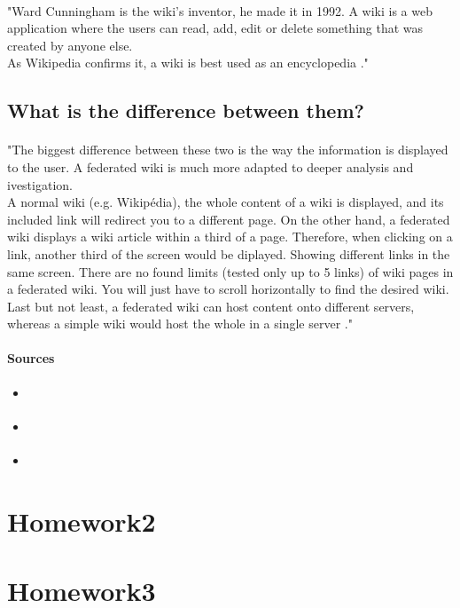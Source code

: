 \documentclass[10pt,a4paper]{article}
\begin{document}
\paragraph{}"Ward Cunningham is the wiki's inventor, he made it in 1992.
A wiki is a web application where the users can read, add, edit or delete something that was created by anyone else.\\
As Wikipedia confirms it, a wiki is best used as an encyclopedia \cite{floref3}."\cite{floref1}

\subsection{What is the difference between them?}
\paragraph{}"The biggest difference between these two is the way the information is displayed to the user. A federated wiki is much more adapted to deeper analysis and ivestigation.\\
A normal wiki (e.g. Wikipédia), the whole content of a wiki is displayed, and its included link will redirect you to a different page. On the other hand, a federated wiki displays a wiki article within a third of a page. Therefore, when clicking on a link, another third of the screen would be diplayed. Showing different links in the same screen. There are no found limits (tested only up to 5 links) of wiki pages in a federated wiki. You will just have to scroll horizontally to find the desired wiki.\\
Last but not least, a federated wiki can host content onto different servers, whereas a simple wiki would host the whole in a single server \cite{floref1}\cite{floref3}."\cite{floref1}

\paragraph{Sources}
\begin{itemize}
\item \cite{floref1}
\item \cite{floref2} 
\item \cite{floref3}
\end{itemize}




\newpage
\section{Homework2}
\paragraph{}



\newpage
\section{Homework3}
\paragraph{}





\newpage
\listoffigures

\newpage
{}

\end{document}
